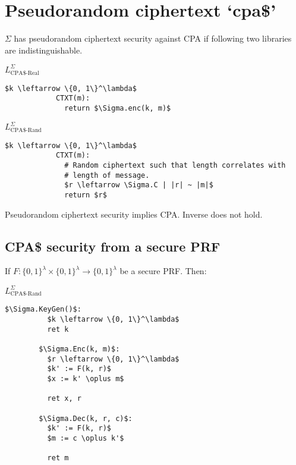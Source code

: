 \documentclass[a4paper]{scrreprt}
\begin{document}
\section{Pseudorandom ciphertext `cpa\$'}

$\Sigma$ has pseudorandom ciphertext security against CPA if following two
libraries are indistinguishable.

\begin{tcbraster}[raster columns=2,raster equal height,nobeforeafter,raster column skip=2cm]
	\begin{library}{$L^\Sigma_{\text{CPA\$-Real}}$}
		\begin{lstlisting}[mathescape=true,autogobble=true]
			$k \leftarrow \{0, 1\}^\lambda$
			CTXT(m):
			  return $\Sigma.enc(k, m)$
		\end{lstlisting}
	\end{library}
	\begin{library}{$L^\Sigma_{\text{CPA\$-Rand}}$}
		\begin{lstlisting}[mathescape=true,autogobble=true]
			$k \leftarrow \{0, 1\}^\lambda$
			CTXT(m):
			  # Random ciphertext such that length correlates with
			  # length of message.
			  $r \leftarrow \Sigma.C | |r| ~ |m|$
			  return $r$
		\end{lstlisting}
	\end{library}
\end{tcbraster}

Pseudorandom ciphertext security implies CPA. Inverse does not hold.

\subsection{CPA\$ security from a secure PRF}

If $F: \{0, 1\}^\lambda \times \{0, 1\}^\lambda \rightarrow \{0, 1\}^\lambda$
be a secure PRF. Then:

\begin{library}{$L^\Sigma_{\text{CPA\$-Rand}}$}
	\begin{lstlisting}[mathescape=true,autogobble=true]
		$\Sigma.KeyGen()$:
		  $k \leftarrow \{0, 1\}^\lambda$
		  ret k

		$\Sigma.Enc(k, m)$:
		  $r \leftarrow \{0, 1\}^\lambda$
		  $k' := F(k, r)$
		  $x := k' \oplus m$

		  ret x, r

		$\Sigma.Dec(k, r, c)$:
		  $k' := F(k, r)$
		  $m := c \oplus k'$

		  ret m
	\end{lstlisting}
\end{library}
\end{document}
